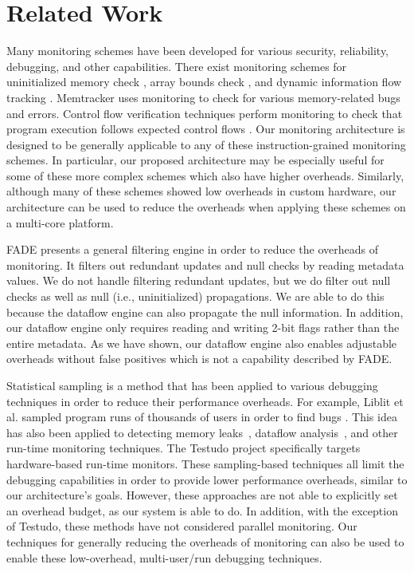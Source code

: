 \section{Related Work}
\label{sec:related}

Many monitoring schemes have been developed for various security, reliability,
debugging, and other capabilities. There exist monitoring schemes for uninitialized
memory check \cite{mondrian-asplos02}, array bounds check
\cite{hardbound-asplos08, clause-ase07}, and dynamic information flow
tracking \cite{dift-asplos04, raksha-isca07, loki-osdi08}.
Memtracker \cite{memtracker-hpca07} uses monitoring to check for various
memory-related bugs and errors.  Control flow verification techniques perform
monitoring to check that program execution follows expected control flows
\cite{schuette-comp87, impres-dac06,
kayaalp-isca12}.  Our monitoring architecture is designed to
be generally applicable to any of these instruction-grained monitoring schemes.
In particular, our proposed architecture may be especially useful for some of
these more complex schemes which also have higher overheads.  Similarly,
although many of these schemes showed low overheads in custom hardware, our
architecture can be used to reduce the overheads when applying these schemes on
a multi-core platform.
 
FADE \cite{fade-hpca14} presents a general filtering engine in order to reduce
the overheads of monitoring. It filters out redundant updates and null checks
by reading metadata values. We do not handle filtering redundant updates, but
we do filter out null checks as well as null (i.e., uninitialized)
propagations.  We are able to do this because the dataflow engine can also
propagate the null information.  In addition, our dataflow engine only
requires reading and writing 2-bit flags rather than the entire metadata.  As
we have shown, our dataflow engine also enables adjustable overheads without
false positives which is not a capability described by FADE.

Statistical sampling is a method that has been applied to various debugging
techniques in order to reduce their performance overheads. For example, Liblit
et al. sampled program runs of thousands of users in order to find bugs
\cite{liblit-pldi05}. This idea has also been applied to detecting memory
leaks~\cite{chilimbi-asplos04}, dataflow analysis~\cite{greathouse-cgo11}, and
other run-time monitoring techniques. The Testudo project
\cite{testudo-micro08} specifically targets hardware-based run-time monitors.
These sampling-based techniques all limit the debugging capabilities in order
to provide lower performance overheads, similar to our architecture's goals.
However, these approaches are not able to explicitly set an overhead budget, as
our system is able to do. In addition, with the exception of Testudo, these
methods have not considered parallel monitoring. Our techniques for generally
reducing the overheads of monitoring can also be used to enable these
low-overhead, multi-user/run debugging techniques.


